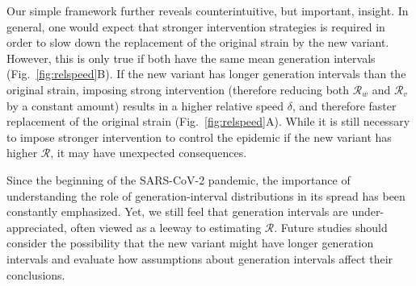\documentclass[12pt]{article}
\newcommand{\fref}[1]{Fig.~\ref{fig:#1}}
\newcommand{\RR}{\ensuremath{{\mathcal R}}\xspace}
\begin{document}
Our simple framework further reveals counterintuitive, but important, insight.
In general, one would expect that stronger intervention strategies is required in order to slow down the replacement of the original strain by the new variant.
However, this is only true if both have the same mean generation intervals (\fref{relspeed}B).
If the new variant has longer generation intervals than the original strain, imposing strong intervention (therefore reducing both $\RR_w$ and $\RR_v$ by a constant amount) results in a higher relative speed $\delta$, and therefore faster replacement of the original strain (\fref{relspeed}A).
While it is still necessary to impose stronger intervention to control the epidemic if the new variant has higher $\RR$, it may have unexpected consequences.

Since the beginning of the SARS-CoV-2 pandemic, the importance of understanding the role of generation-interval distributions in its spread has been constantly emphasized.
Yet, we still feel that generation intervals are under-appreciated, often viewed as a leeway to estimating $\RR$.
Future studies should consider the possibility that the new variant might have longer generation intervals and evaluate how assumptions about generation intervals affect their conclusions.


\end{document}
